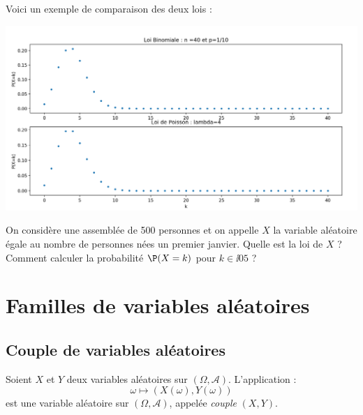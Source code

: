 \documentclass[french,11pt,twoside]{VcCours}
\begin{document}
\begin{Demonstration}{}
\vspace*{7cm}
\end{Demonstration}


Voici un exemple de comparaison des deux lois :


\begin{center}
\includegraphics[scale=0.4]{Poisson}
\end{center}

\begin{Exemple}{}
On considère une assemblée de 500 personnes et on appelle $X$ la variable aléatoire égale au nombre de personnes nées un premier janvier. Quelle est la loi de $X$ ? Comment calculer la probabilité $\P(X=k)$ pour $k\in \ii 0 5$ ?

\vspace*{4cm}
\end{Exemple}

\section{Familles de variables aléatoires}
\subsection{Couple de variables aléatoires}

\begin{TheoremeDefinition}{} Soient $X$ et $Y$ deux variables aléatoires sur $(\Omega, \mathcal{A})$. L'application :
$$ \omega \mapsto (X(\omega), Y(\omega))$$
est une variable aléatoire sur $(\Omega, \mathcal{A})$, appelée \emph{couple} $(X,Y)$.
\end{TheoremeDefinition}{}

\begin{Demonstration}{}

\vspace*{5cm}
\end{Demonstration}
\end{document}

